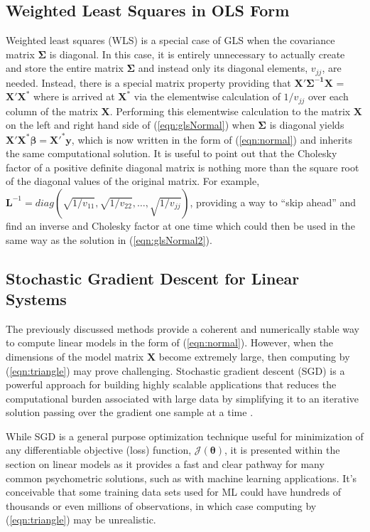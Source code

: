 \documentclass[12pt]{article}
\begin{document}
\subsection*{Weighted Least Squares in OLS Form}

Weighted least squares (WLS) is a special case of GLS when the covariance matrix $\bm{\Sigma}$ is diagonal. In this case, it is entirely unnecessary to actually create and store the entire matrix $\bm{\Sigma}$ and instead only its diagonal elements, $v_{jj}$, are needed. Instead, there is a special matrix property providing that $\bm{X'\Sigma^{-1}X}$ =  $\bm{X'X^*}$ where is arrived at $\bm{X}^*$ via the elementwise calculation of $1/v_{jj}$ over each column of the matrix $\bm{X}$. Performing this elementwise calculation to the matrix $\bm{X}$ on the left and right hand side of (\ref{eqn:glsNormal}) when $\bm{\Sigma}$ is diagonal yields $\bm{X'X^*}\bm{\beta} = \bm{X'^{*}y}$, which is now written in the form of (\ref{eqn:normal}) and inherits the same computational solution. It is useful to point out that the Cholesky factor of a positive definite diagonal matrix is nothing more than the square root of the diagonal values of the original matrix. For example, $\bm{L}^{-1} = diag(\sqrt{1/v_{11}},\sqrt{1/v_{22}}, \ldots, \sqrt{1/v_{jj}})$, providing a way to ``skip ahead'' and find an inverse and Cholesky factor at one time which could then be used in the same way as the solution in (\ref{eqn:glsNormal2}). 

\subsection*{Stochastic Gradient Descent for Linear Systems}

The previously discussed methods provide a coherent and numerically stable way to compute linear models in the form of (\ref{eqn:normal}). However, when the dimensions of the model matrix $\bm{X}$ become extremely large, then computing by (\ref{eqn:triangle}) may prove challenging. Stochastic gradient descent (SGD) is a powerful approach for building highly scalable applications that reduces the computational burden associated with large data by simplifying it to an iterative solution passing over the gradient one sample at a time \cite{cizek,shamir,tran}.  

While SGD is a general purpose optimization technique useful for minimization of any differentiable objective (loss) function, $\mathcal{J}(\bm{\theta})$, it is presented within the section on linear models as it provides a fast and clear pathway for many common psychometric solutions, such as with machine learning applications. It's conceivable that some training data sets used for ML could have hundreds of thousands or even millions of observations, in which case computing by (\ref{eqn:triangle}) may be unrealistic.   
\end{document}
